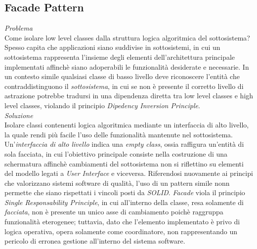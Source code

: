 \documentclass{article}
\begin{document}
\subsection*{Facade Pattern}
\large
\textit{Problema}\\
Come isolare low level classes dalla struttura logica algoritmica del sottosistema?\vspace*{14pt}\\
Spesso capita che applicazioni siano suddivise in sottosistemi, in cui un sottosistema rappresenta l'insieme degli elementi dell'architettura principale implementati affinchè siano adoperabili le funzionalità desiderate e necessarie. In un contesto simile qualsiasi classe di basso livello deve riconoscere l'entità che contraddistinguono il \textit{sottosistema}, in cui se non è presente il corretto livello di astrazione potrebbe tradursi in una dipendenza diretta tra low level classes e high level classes, violando il principio \textit{Dipedency Inversion Principle}.\vspace*{14pt}\\
\textit{Soluzione}\\
Isolare classi contenenti logica algoritmica mediante un interfaccia di alto livello, la quale rendi più facile l'uso delle funzionalità mantenute nel sottosistema.\vspace*{14pt}\\
Un'\textit{interfaccia di alto livello} indica una \textit{empty class}, ossia raffigura un'entità di sola facciata, in cui l'obiettivo principale consiste nella costruzione di una schermatura affinchè cambiamenti del sottosistema non si riflettino su elementi del modello legati a \textit{User Interface} e viceversa. Riferendosi nuovamente ai principi che valorizzano sistemi software di qualità, l'uso di un pattern simile nonn permette che siano rispettati i vincoli posti da \textit{SOLID}. \textit{Facade} viola il principio \textit{Single Responsability Principle}, in cui all'interno della classe, resa solamente di \textit{facciata}, non è presente un unico asse di cambiamento poichè raggruppa funzionalità eterogenee; tuttavia, dato che l'elemento implementato è privo di logica operativa, opera solamente come coordinatore, non rappresentando un pericolo di erronea gestione all'interno del sistema software. 
\end{document}
